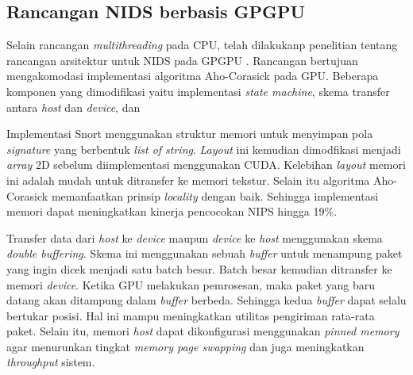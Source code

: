 

  \subsection{Rancangan NIDS berbasis GPGPU}

    Selain rancangan \emph{multithreading} pada CPU, telah dilakukanp penelitian tentang rancangan arsitektur untuk NIDS pada GPGPU \parencite{gnort2008}. Rancangan bertujuan mengakomodasi implementasi algoritma Aho-Corasick pada GPU. Beberapa komponen yang dimodifikasi yaitu implementasi \emph{state machine}, skema transfer antara \emph{host} dan \emph{device}, dan 

    Implementasi Snort menggunakan struktur memori untuk menyimpan pola \emph{signature} yang berbentuk \emph{list of string}. \emph{Layout} ini kemudian dimodfikasi menjadi \emph{array} 2D sebelum diimplementasi menggunakan CUDA. Kelebihan \emph{layout} memori ini adalah mudah untuk ditransfer ke memori tekstur. Selain itu algoritma Aho-Corasick memanfaatkan prinsip \emph{locality} dengan baik. Sehingga implementasi memori dapat meningkatkan kinerja pencocokan NIPS hingga 19\%.

    Transfer data dari \emph{host} ke \emph{device} maupun \emph{device} ke \emph{host} menggunakan skema \emph{double buffering}. Skema ini menggunakan sebuah \emph{buffer} untuk menampung paket yang ingin dicek menjadi satu batch besar. Batch besar kemudian ditransfer ke memori \emph{device}. Ketika GPU melakukan pemrosesan, maka paket yang baru datang akan ditampung dalam \emph{buffer} berbeda. Sehingga kedua \emph{buffer} dapat selalu bertukar posisi. Hal ini mampu meningkatkan utilitas pengiriman rata-rata paket. Selain itu, memori \emph{host} dapat dikonfigurasi menggunakan \emph{pinned memory} agar menurunkan tingkat \emph{memory page swapping} dan juga meningkatkan \emph{throughput} sistem.


